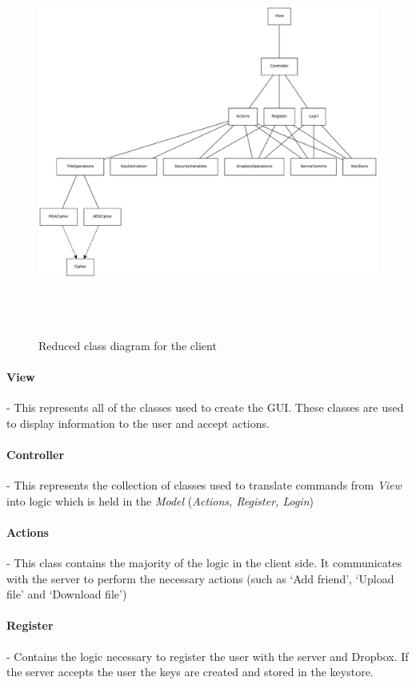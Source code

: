 \documentclass[12pt, titlepage]{article}
\begin{document}
\begin{figure}
\centerline{\includegraphics[height=5.0in,width=8in,angle=0]{client-classDiagram.pdf}}
\caption{Reduced class diagram for the client}
\label{fig:reducedClientClass}
\end{figure}

\paragraph*{View} - This represents all of the classes used to create the GUI. These classes are used to display information to the user and accept actions.
\paragraph*{Controller} - This represents the collection of classes used to translate commands from \textit{View} into logic which is held in the \textit{Model} (\textit{Actions, Register, Login})
\paragraph*{Actions} - This class contains the majority of the logic in the client side. It communicates with the server to perform the necessary actions (such as `Add friend', `Upload file' and `Download file')
\paragraph*{Register} - Contains the logic necessary to register the user with the server and Dropbox. If the server accepts the user the keys are created and stored in the keystore.
\end{document}
